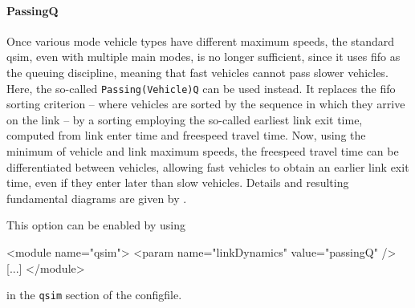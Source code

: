 \paragraph{PassingQ} 
Once various mode vehicle types have different maximum speeds, the standard \gls{qsim}, even with multiple main modes, is no longer sufficient, since it uses \gls{fifo} as the queuing discipline, meaning that fast vehicles cannot pass slower vehicles. Here, the so-called \lstinline|Passing(Vehicle)Q| can be used instead.  It replaces the \gls{fifo} sorting criterion -- where vehicles are sorted by the sequence in which they arrive on the link -- by a sorting employing the so-called earliest link exit time, computed from link enter time and freespeed travel time.  Now, using the minimum of vehicle and link maximum speeds, the freespeed travel time can be differentiated between vehicles, allowing fast vehicles to obtain an earlier link exit time, even if they enter later than slow vehicles.  Details and resulting fundamental diagrams are given by \citet{AgarwalEtcMixedTraffic}.

This option can be enabled by using
\begin{xml}
<module name="qsim">
   <param name="linkDynamics" value="passingQ" />
   [...]
</module>
\end{xml}
in the \lstinline{qsim} section of the \gls{configfile}.

